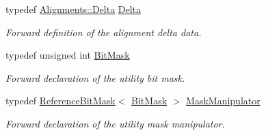 \begin{DoxyCompactItemize}
typedef \hyperlink{class_d_d4hep_1_1_alignments_1_1_delta}{Alignments\+::\+Delta} \hyperlink{class_d_d4hep_1_1_alignments_1_1_alignment_data_a3e67a5cbb3449006e9552b0f7bd98d45}{Delta}
\begin{DoxyCompactList}\small\item\em Forward definition of the alignment delta data. \end{DoxyCompactList}\item 
typedef unsigned int \hyperlink{class_d_d4hep_1_1_alignments_1_1_alignment_data_ab5c31f7e5512ca675be8323bc723b123}{Bit\+Mask}
\begin{DoxyCompactList}\small\item\em Forward declaration of the utility bit mask. \end{DoxyCompactList}\item 
typedef \hyperlink{class_d_d4hep_1_1_reference_bit_mask}{Reference\+Bit\+Mask}$<$ \hyperlink{class_d_d4hep_1_1_alignments_1_1_alignment_data_ab5c31f7e5512ca675be8323bc723b123}{Bit\+Mask} $>$ \hyperlink{class_d_d4hep_1_1_alignments_1_1_alignment_data_a7eb85e9201294a4ae7a3c5fe6d913233}{Mask\+Manipulator}
\begin{DoxyCompactList}\small\item\em Forward declaration of the utility mask manipulator. \end{DoxyCompactList}\end{DoxyCompactItemize}
